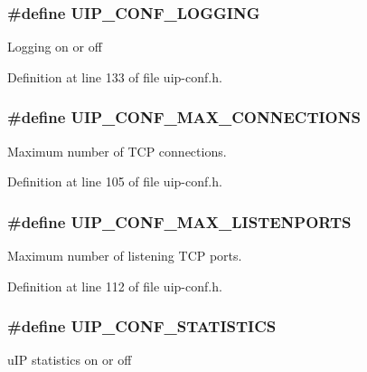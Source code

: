 \hypertarget{group__uipfw_ga3001114ddadc1f2ada5cc9a780e866fc}{
\subsubsection[{UIP\_\-CONF\_\-LOGGING}]{\setlength{\rightskip}{0pt plus 5cm}\#define UIP\_\-CONF\_\-LOGGING}}
\label{group__uipfw_ga3001114ddadc1f2ada5cc9a780e866fc}
Logging on or off 

Definition at line 133 of file uip-\/conf.h.

\hypertarget{group__uipfw_ga3f6f1f6f98431f2d33ed30a30d2ccc35}{
\subsubsection[{UIP\_\-CONF\_\-MAX\_\-CONNECTIONS}]{\setlength{\rightskip}{0pt plus 5cm}\#define UIP\_\-CONF\_\-MAX\_\-CONNECTIONS}}
\label{group__uipfw_ga3f6f1f6f98431f2d33ed30a30d2ccc35}
Maximum number of TCP connections. 

Definition at line 105 of file uip-\/conf.h.

\hypertarget{group__uipfw_ga974c9b4bbe6b07cc1d64ac4fad278030}{
\subsubsection[{UIP\_\-CONF\_\-MAX\_\-LISTENPORTS}]{\setlength{\rightskip}{0pt plus 5cm}\#define UIP\_\-CONF\_\-MAX\_\-LISTENPORTS}}
\label{group__uipfw_ga974c9b4bbe6b07cc1d64ac4fad278030}
Maximum number of listening TCP ports. 

Definition at line 112 of file uip-\/conf.h.

\hypertarget{group__uipfw_ga529648ad3b0b327a43689b0f1779ff55}{
\subsubsection[{UIP\_\-CONF\_\-STATISTICS}]{\setlength{\rightskip}{0pt plus 5cm}\#define UIP\_\-CONF\_\-STATISTICS}}
\label{group__uipfw_ga529648ad3b0b327a43689b0f1779ff55}
uIP statistics on or off 

